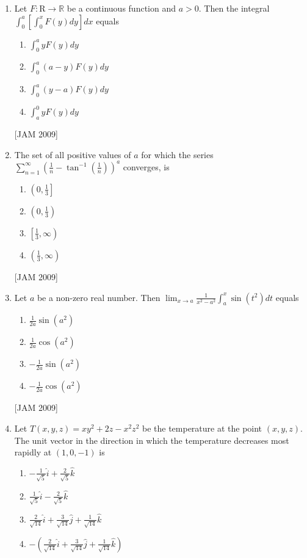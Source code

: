 \begin{enumerate}
\item  Let $F: \mathrm{R} \rightarrow \mathbb{R}$ be a continuous function and $a>0$. Then the integral $\int_{0}^{a}\left[\int_{0}^{x} F(y) d y\right] d x$ equals
\begin{enumerate}
    \item $\int_{0}^{a} y F(y) d y$ 
\item $\int_{0}^{a}(a-y) F(y) d y$ 
\item $\int_{0}^{a}(y-a) F(y) d y$ 
\item $\int_{a}^{0} y F(y) d y$
\end{enumerate}
\hfill [JAM 2009]

 


\item  The set of all positive values of $a$ for which the series $\sum_{n=1}^{\infty}\left(\frac{1}{n}-\tan ^{-1}\left(\frac{1}{n}\right)\right)^{a}$ converges, is 
\begin{enumerate}
    
\item $\left(0, \frac{1}{3}\right]$ 
\item $\left(0, \frac{1}{3}\right)$ 
\item $\left[\frac{1}{3}, \infty\right)$ 
\item $\left(\frac{1}{3}, \infty\right)$
\end{enumerate}
\hfill [JAM 2009]



\item  Let $a$ be a non-zero real number. Then $\lim _{x \rightarrow a} \frac{1}{x^{2}-a^{2}} \int_{a}^{x} \sin \left(t^{2}\right) d t$ equals 
\begin{enumerate}
    
\item $\frac{1}{2 a} \sin \left(a^{2}\right)$ 
\item $\frac{1}{2 a} \cos \left(a^{2}\right)$ 
\item $-\frac{1}{2 a} \sin \left(a^{2}\right)$ 
\item $-\frac{1}{2 a} \cos \left(a^{2}\right)$
\end{enumerate}
\hfill [JAM 2009]



\item  Let $T(x, y, z)=x y^{2}+2 z-x^{2} z^{2}$ be the temperature at the point $(x, y, z)$. The unit vector in the direction in which the temperature decreases most rapidly at $(1,0,-1)$ is
\begin{enumerate}
    \item $-\frac{1}{\sqrt{5}} \hat{i}+\frac{2}{\sqrt{5}} \hat{k}$ 
\item $\frac{1}{\sqrt{5}} \hat{i}-\frac{2}{\sqrt{5}} \hat{k}$ 
\item $\frac{2}{\sqrt{14}} \hat{i}+\frac{3}{\sqrt{14}} \hat{j}+\frac{1}{\sqrt{14}} \hat{k}$ 
\item $-\left(\frac{2}{\sqrt{14}} \hat{i}+\frac{3}{\sqrt{14}} \hat{j}+\frac{1}{\sqrt{14}} \hat{k}\right)$


\end{enumerate}
\end{enumerate}
